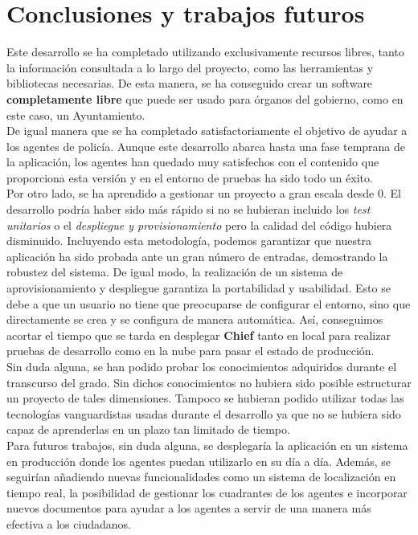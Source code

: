 \chapter{Conclusiones y trabajos futuros}

Este desarrollo se ha completado utilizando exclusivamente recursos libres, tanto la información consultada a lo largo del proyecto, como 
las herramientas y bibliotecas necesarias. De esta manera, se ha conseguido crear un software \textbf{completamente libre} que puede
ser usado para órganos del gobierno, como en este caso, un Ayuntamiento. \\

De igual manera que se ha completado satisfactoriamente el objetivo de ayudar a los agentes de policía. Aunque este desarrollo abarca hasta 
una fase temprana de la aplicación, los agentes han quedado muy satisfechos con el contenido que proporciona esta versión y en el entorno
de pruebas ha sido todo un éxito.\\

Por otro lado, se ha aprendido a gestionar un proyecto a gran escala desde 0. El desarrollo podría haber sido más rápido si no se hubieran 
incluido los \textit{test unitarios} o el \textit{despliegue y provisionamiento} pero la calidad del código hubiera disminuido. Incluyendo
esta metodología, podemos garantizar que nuestra aplicación ha sido probada ante un gran número de entradas, demostrando la robustez del sistema. 
De igual modo, la realización de un sistema de aprovisionamiento y despliegue garantiza la portabilidad y usabilidad. Esto se debe a que
un usuario no tiene que preocuparse de configurar el entorno, sino que directamente se crea y se configura de manera automática. Así, conseguimos
acortar el tiempo que se tarda en desplegar \textbf{Chief} tanto en local para realizar pruebas de desarrollo como en la nube para pasar el estado de
producción.\\

Sin duda alguna, se han podido probar los conocimientos adquiridos durante el transcurso del grado. Sin dichos conocimientos no hubiera sido
posible estructurar un proyecto de tales dimensiones. Tampoco se hubieran podido utilizar todas las tecnologías vanguardistas usadas durante 
el desarrollo ya que no se hubiera sido capaz de aprenderlas en un plazo tan limitado de tiempo.\\

Para futuros trabajos, sin duda alguna, se desplegaría la aplicación en un sistema en producción donde los agentes puedan utilizarlo en su día
a día. Además, se seguirían añadiendo nuevas funcionalidades como un sistema de localización en tiempo real, la posibilidad de gestionar los cuadrantes de los agentes e incorporar nuevos documentos para ayudar a los agentes a servir de una manera más efectiva a los ciudadanos.